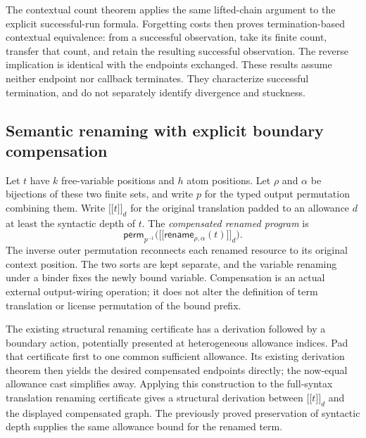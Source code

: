
The contextual count theorem applies the same lifted-chain argument to the
explicit successful-run formula. Forgetting costs then proves termination-based
contextual equivalence: from a successful observation, take its finite count,
transfer that count, and retain the resulting successful observation. The
reverse implication is identical with the endpoints exchanged. These results
assume neither endpoint nor callback terminates. They characterize successful
termination, and do not separately identify divergence and stuckness.


\subsection{Semantic renaming with explicit boundary compensation}
Let $t$ have $k$ free-variable positions and $h$ atom positions. Let $\rho$
and $\alpha$ be bijections of these two finite sets, and write $p$ for the
typed output permutation combining them. Write $\lbrack\!\lbrack t\rbrack\!\rbrack_d$
for the original translation padded to an allowance $d$ at least the syntactic
depth of $t$. The \emph{compensated renamed program} is
\[
 \mathsf{perm}_{p^{-1}}
   \bigl(\lbrack\!\lbrack \mathsf{rename}_{\rho,\alpha}(t)\rbrack\!\rbrack_d\bigr).
\]
The inverse outer permutation reconnects each renamed resource to its original
context position. The two sorts are kept separate, and the variable renaming
under a binder fixes the newly bound variable. Compensation is an actual
external output-wiring operation; it does not alter the definition of term
translation or license permutation of the bound prefix.

The existing structural renaming certificate has a derivation followed by a
boundary action, potentially presented at heterogeneous allowance indices.
Pad that certificate first to one common sufficient allowance. Its existing
derivation theorem then yields the desired compensated endpoints directly;
the now-equal allowance cast simplifies away. Applying this construction to
the full-syntax translation renaming certificate gives a structural derivation
between $\lbrack\!\lbrack t\rbrack\!\rbrack_d$ and the displayed compensated graph.
The previously proved preservation of syntactic depth supplies the same
allowance bound for the renamed term.

